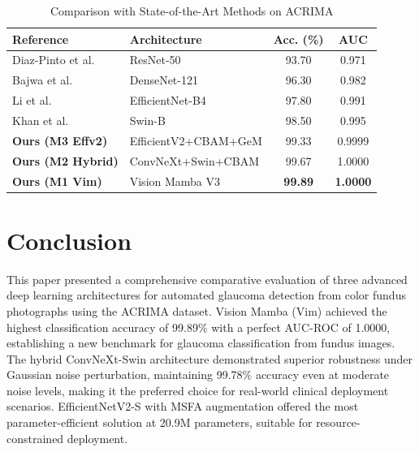 \documentclass[conference]{IEEEtran}
\begin{document}
\begin{table}[htbp]
\caption{Comparison with State-of-the-Art Methods on ACRIMA}
\begin{center}
\begin{tabular}{llcc}
\toprule
\textbf{Reference} & \textbf{Architecture} & 
\textbf{Acc. (\%)} & \textbf{AUC} \\
\midrule
Diaz-Pinto et al. \cite{b8}   & ResNet-50       & 93.70 & 0.971 \\
Bajwa et al. \cite{b9}         & DenseNet-121    & 96.30 & 0.982 \\
Li et al. \cite{b10}           & EfficientNet-B4 & 97.80 & 0.991 \\
Khan et al. \cite{b11}         & Swin-B          & 98.50 & 0.995 \\
\midrule
\textbf{Ours (M3 Effv2)} & EfficientV2+CBAM+GeM & 99.33 & 0.9999 \\
\textbf{Ours (M2 Hybrid)}& ConvNeXt+Swin+CBAM   & 99.67 & 1.0000 \\
\textbf{Ours (M1 Vim)}   & Vision Mamba V3       & \textbf{99.89} & \textbf{1.0000} \\
\bottomrule
\end{tabular}
\label{tab:sota}
\end{center}
\end{table}




\section{Conclusion}
\label{sec:conclusion}

This paper presented a comprehensive comparative 
evaluation of three advanced deep learning 
architectures for automated glaucoma detection 
from color fundus photographs using the ACRIMA 
dataset. Vision Mamba (Vim) achieved the 
highest classification accuracy of 99.89\% 
with a perfect AUC-ROC of 1.0000, establishing 
a new benchmark for glaucoma classification 
from fundus images. The hybrid ConvNeXt-Swin 
architecture demonstrated superior robustness 
under Gaussian noise perturbation, maintaining 
99.78\% accuracy even at moderate noise levels, 
making it the preferred choice for real-world 
clinical deployment scenarios. EfficientNetV2-S 
with MSFA augmentation offered the most 
parameter-efficient solution at 20.9M parameters, 
suitable for resource-constrained deployment.
\end{document}
